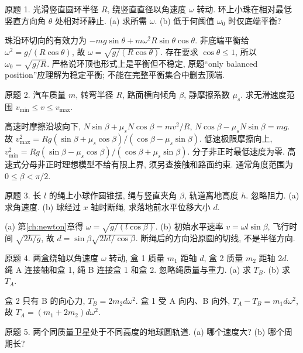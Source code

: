 \begin{exercise}
原题 1. 光滑竖直圆环半径 $R$, 绕竖直直径以角速度 $\omega$ 转动. 环上小珠在相对最低竖直方向角 $\theta$ 处相对环静止. (a) 求所需 $\omega$. (b) 低于何阈值 $\omega_0$ 时仅底端平衡?
\end{exercise}
\begin{solution}
珠沿环切向的有效力为 $-mg\sin\theta+m\omega^2R\sin\theta\cos\theta$. 非底端平衡给 $\omega^2=g/(R\cos\theta)$, 故 $\omega=\sqrt{g/(R\cos\theta)}$. 存在要求 $\cos\theta\le1$, 所以 $\omega_0=\sqrt{g/R}$. 严格说环顶也形式上是平衡但不稳定, 原题“only balanced position”应理解为稳定平衡; 不能在完整平衡集合中删去顶端.
\end{solution}
\begin{exercise}
原题 2. 汽车质量 $m$, 转弯半径 $R$, 路面横向倾角 $\beta$, 静摩擦系数 $\mu_s$. 求无滑速度范围 $v_{\min}\le v\le v_{\max}$.
\end{exercise}
\begin{solution}
高速时摩擦沿坡向下, $N\sin\beta+\mu_sN\cos\beta=mv^2/R$, $N\cos\beta-\mu_sN\sin\beta=mg$. 故 $v_{\max}^2=Rg(\sin\beta+\mu_s\cos\beta)/(\cos\beta-\mu_s\sin\beta)$. 低速极限摩擦向上, $v_{\min}^2=Rg(\sin\beta-\mu_s\cos\beta)/(\cos\beta+\mu_s\sin\beta)$. 分子非正时最低速度为零. 高速式分母非正时理想模型不给有限上界, 须另查接触和路面约束. 通常角度范围为 $0\le\beta<\pi/2$.
\end{solution}
\begin{exercise}
原题 3. 长 $l$ 的绳上小球作圆锥摆, 绳与竖直夹角 $\beta$, 轨道离地高度 $h$. 忽略阻力. (a) 求角速度. (b) 球经过 $x$ 轴时断绳, 求落地前水平位移大小 $d$.
\end{exercise}
\begin{solution}
(a) 第\ref{ch:newton}章得 $\omega=\sqrt{g/(l\cos\beta)}$. (b) 初始水平速率 $v=\omega l\sin\beta$, 飞行时间 $\sqrt{2h/g}$, 故 $d=\sin\beta\sqrt{2hl/\cos\beta}$. 断绳后的方向沿原圆的切线, 不是半径方向.
\end{solution}
\begin{exercise}
原题 4. 两盒绕轴以角速度 $\omega$ 转动, 盒 1 质量 $m_1$ 距轴 $d$, 盒 2 质量 $m_2$ 距轴 $2d$. 绳 A 连接轴和盒 1, 绳 B 连接盒 1 和盒 2. 忽略绳质量与重力. (a) 求 $T_B$. (b) 求 $T_A$.
\end{exercise}
\begin{solution}
盒 2 只有 B 的向心力, $T_B=2m_2d\omega^2$. 盒 1 受 A 向内、B 向外, $T_A-T_B=m_1d\omega^2$, 故 $T_A=(m_1+2m_2)d\omega^2$.
\end{solution}
\begin{exercise}
原题 5. 两个同质量卫星处于不同高度的地球圆轨道. (a) 哪个速度大? (b) 哪个周期长?
\end{exercise}
